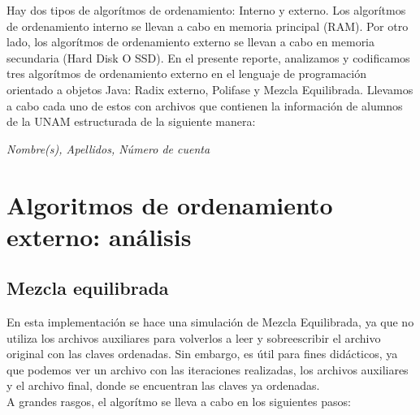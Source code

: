 \documentclass[12pt, letterpaper]{report}
\begin{document}
    Hay dos tipos de algorítmos de ordenamiento: Interno y externo. Los algorítmos de ordenamiento interno se llevan a cabo en memoria principal (RAM). Por otro lado, los algorítmos de ordenamiento externo se llevan a cabo en memoria secundaria (Hard Disk O SSD). En el presente reporte, analizamos y codificamos tres algorítmos de ordenamiento externo en el lenguaje de programación orientado a objetos Java: Radix externo, Polifase y Mezcla Equilibrada. Llevamos a cabo cada uno de estos con archivos que contienen la información de alumnos de la UNAM  estructurada de la siguiente manera: \\
    
        \begin{center}
            \textit{Nombre(s), Apellidos, Número de cuenta}
        \end{center}
    \section*{Algoritmos de ordenamiento externo: análisis}
    
    \subsection*{Mezcla equilibrada}
    En esta implementación se hace una simulación de Mezcla Equilibrada, ya que no utiliza los archivos auxiliares para volverlos a leer y sobreescribir el archivo original con las claves ordenadas. Sin embargo, es útil para fines didácticos, ya que podemos ver un archivo con las iteraciones realizadas, los archivos auxiliares y el archivo final, donde se encuentran las claves ya ordenadas.\\
    
    A grandes rasgos, el algorítmo se lleva a cabo en los siguientes pasos: 
    
\end{document}
